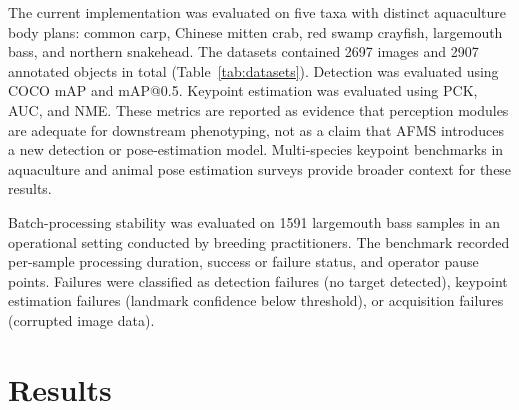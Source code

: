 \documentclass[final,3p,times]{elsarticle}
\begin{document}
The current implementation was evaluated on five taxa with distinct aquaculture body plans: common carp, Chinese mitten crab, red swamp crayfish, largemouth bass, and northern snakehead. The datasets contained 2697 images and 2907 annotated objects in total (Table~\ref{tab:datasets}). Detection was evaluated using COCO mAP and mAP@0.5. Keypoint estimation was evaluated using PCK, AUC, and NME. These metrics are reported as evidence that perception modules are adequate for downstream phenotyping, not as a claim that AFMS introduces a new detection or pose-estimation model. Multi-species keypoint benchmarks in aquaculture \citep{liu2024fishphenokey} and animal pose estimation surveys \citep{lin2025keypoint} provide broader context for these results.

\begin{table}[htbp]
  \centering
  \caption{Datasets used to demonstrate cross-species adaptation.}
  \label{tab:datasets}
  \small
\end{table}

Batch-processing stability was evaluated on 1591 largemouth bass samples in an operational setting conducted by breeding practitioners. The benchmark recorded per-sample processing duration, success or failure status, and operator pause points. Failures were classified as detection failures (no target detected), keypoint estimation failures (landmark confidence below threshold), or acquisition failures (corrupted image data).

\section{Results}
\end{document}
